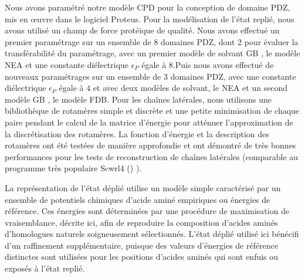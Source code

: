 Nous avons paramétré notre modèle CPD pour la conception de domaine PDZ, mis en œuvre dans le logiciel Proteus. Pour la modélisation de l'état replié, nous avons utilisé un champ de force protéique de qualité. Nous avons effectué un premier paramétrage sur un ensemble de 8 domaines PDZ, dont 2 pour évaluer la transférabilité du paramétrage, avec un premier modèle de solvant \og GB \fg, le modèle NEA et une constante diélectrique $\epsilon_P$  égale à $8$.Puis nous avons effectué de nouveaux paramétrages sur un ensemble de 3 domaines PDZ, avec une constante diélectrique $\epsilon_P$  égale à $4$ et avec deux modèles de solvant, le NEA et un second modèle \og GB \fg , le modèle FDB. Pour les chaînes latérales, nous utilisons une bibliothèque de rotamères simple et discrète et une petite minimisation de chaque paire pendant le calcul de la matrice d'énergie pour atténuer l'approximation de la discrétisation des rotamères. La fonction d'énergie et la description des rotamères ont été testées de manière approfondie et ont démontré de très bonnes performances pour les tests de reconstruction de chaînes latérales \cite{Gaillard16} (comparable au programme très populaire Scwrl4 (\cite{Krivov09}) ).

La représentation de l'état déplié utilise un modèle simple caractérisé par un ensemble de potentiels chimiques d'acide aminé empiriques ou énergies de référence. Ces énergies sont déterminées par une procédure de maximisation de vraisemblance, décrite ici, afin de reproduire la composition d'acides aminés d'homologues naturels soigneusement sélectionnés. L'état déplié utilisé ici bénécifi d'un raffinement supplémentaire, puisque des valeurs d'énergies de référence distinctes sont utilisées pour les positions d'acides aminés qui sont enfuis ou exposés à l'état replié.  

